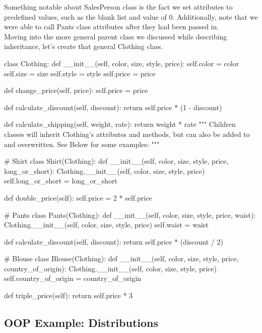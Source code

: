 Something notable about SalesPerson class is the fact we set attributes to predefined values, such as the blank list and value of 0. Additionally, note that we were able to call Pants class attributes after they had been passed in.
\\

Moving into the more general parent class we discussed while describing inheritance, let's create that general Clothing class.

\begin{python}
	class Clothing:
		def __init__(self, color, size, style, price):
			self.color = color
			self.size = size
			self.style = style
			self.price = price
		
		def change_price(self, price):
			self.price = price
		
		def calculate_discount(self, discount):
			return self.price * (1 - discount)
		
		def calculate_shipping(self, weight, rate):
			return weight * rate
	"""
	Children classes will inherit Clothing's attributes and methods,
	but can also be added to and overwritten.
	See Below for some examples:
	"""
	
	# Shirt
	class Shirt(Clothing):
		def __init__(self, color, size, style, price, long_or_short):
			Clothing.__init__(self, color, size, style, price)
			self.long_or_short = long_or_short
		
		def double_price(self):
		self.price = 2 * self.price
	
	# Pants
	class Pants(Clothing):
		def __init__(self, color, size, style, price, waist):
			Clothing.__init__(self, color, size, style, price)
			self.waist = waist
		
		def calculate_discount(self, discount):
			return self.price * (discount / 2)
	
	# Blouse
	class Blouse(Clothing):
		def __init__(self, color, size, style, price, country_of_origin):
			Clothing.__init__(self, color, size, style, price)
			self.country_of_origin = country_of_origin
		
		def triple_price(self):
			return self.price * 3
\end{python}


\subsection{OOP Example: Distributions}


